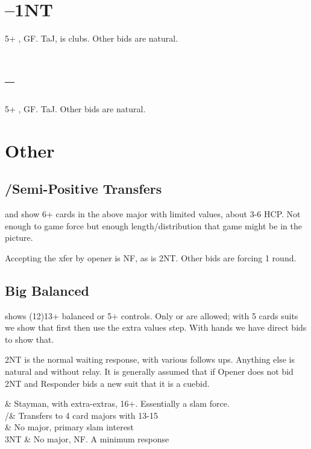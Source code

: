 \documentclass[tom-jenni]{subfile}
\begin{document}
	\section[1C--1NT]{--1NT}
	
	5+ \hhh, GF.  TaJ,  is clubs. Other bids are natural.
	
	\section[1C--2C]{--}
	
	5+ \ddd, GF.  TaJ. Other bids are natural.
	
	\section{Other}
	
	\subsection{/\hhh Semi-Positive Transfers}	
		 and  show 6+ cards in the above major with limited values, about 3-6 HCP.  Not enough to game force but enough length/distribution that game might be in the picture.
		
		Accepting the xfer by opener is NF, as is 2NT.  Other bids are forcing 1 round.
		
	\subsection{ Big Balanced}
	
	 shows (12)13+ balanced or 5+ controls.  Only  or  are allowed; with 5 cards suits we show that first then use the extra values step.  With  hands we have direct bids to show that.
		
	2NT is the normal waiting response, with various follows ups.  Anything else is natural and without relay.  It is generally assumed that if Opener does not bid 2NT and Responder bids a new suit that it is a cuebid.
	
	\begin{bidtable}{}
		 & Stayman, with extra-extras, 16+.  Essentially a slam force. \\
		/\hhh& Transfers to 4 card majors with 13-15 \\
		 & No major, primary slam interest \\
		3NT & No major, NF.  A minimum  response \\
	\end{bidtable}	
\end{document}
